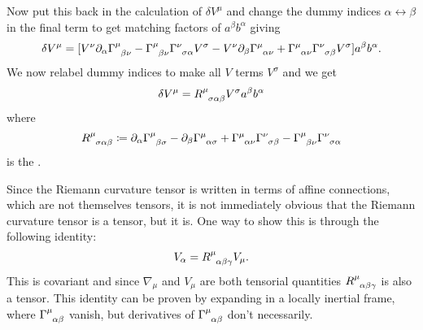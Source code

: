 \documentclass[fleqn]{NotesClass}
\newcommand*{\christoffel}[3]{\tensor{\Gamma}{^{#1}_{{#2}{#3}}}}
\newcommand*{\covariantDerivative}[1]{\nabla_{\!#1}}
\begin{document}
    Now put this back in the calculation of \(\delta V^\mu\) and change the dummy indices \(\alpha \leftrightarrow \beta\) in the final term to get matching factors of \(a^\beta b^\alpha\) giving
    \begin{equation}
        \delta V^\mu = [V^\nu\partial_\alpha \christoffel{\mu}{\beta}{\nu} - \christoffel{\mu}{\beta}{\nu} \christoffel{\nu}{\sigma}{\alpha} V^\sigma - V^\nu\partial_\beta \christoffel{\mu}{\alpha}{\nu} + \christoffel{\mu}{\alpha}{\nu} \christoffel{\nu}{\sigma}{\beta} V^\sigma] a^\beta b^\alpha.
    \end{equation}
    We now relabel dummy indices to make all \(V\) terms \(V^\sigma\) and we get
    \begin{equation}
        \delta V^\mu = \tensor{R}{^\mu_{\sigma\alpha\beta}} V^\sigma a^\beta b^\alpha
    \end{equation}
    where
    \begin{equation}
        \tensor{R}{^\mu_{\sigma\alpha\beta}} \coloneqq \partial_\alpha \christoffel{\mu}{\beta}{\sigma} - \partial_\beta \christoffel{\mu}{\alpha}{\sigma} + \christoffel{\mu}{\alpha}{\nu} \christoffel{\nu}{\sigma}{\beta} - \christoffel{\mu}{\beta}{\nu} \christoffel{\nu}{\sigma}{\alpha}
    \end{equation}
    is the .
    
    Since the Riemann curvature tensor is written in terms of affine connections, which are not themselves tensors, it is not immediately obvious that the Riemann curvature tensor is a tensor, but it is.
    One way to show this is through the following identity:
    \begin{equation}
        [\covariantDerivative{\gamma}\covariantDerivative{\beta} - \covariantDerivative{\beta}\covariantDerivative{\gamma}] V_\alpha = \tensor{R}{^\mu_{\alpha\beta\gamma}} V_\mu.
    \end{equation}
    This is covariant and since \(\covariantDerivative{\mu}\) and \(V_\mu\) are both tensorial quantities \(\tensor{R}{^\mu_{\alpha\beta\gamma}}\) is also a tensor.
    This identity can be proven by expanding in a locally inertial frame, where \(\christoffel{\mu}{\alpha}{\beta}\) vanish, but derivatives of \(\christoffel{\mu}{\alpha}{\beta}\) don't necessarily.
    
\end{document}
